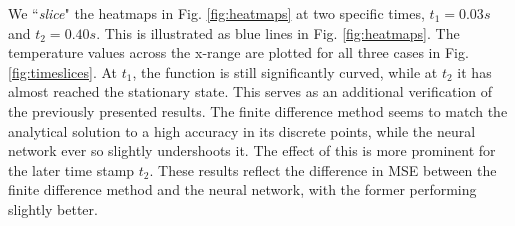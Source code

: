 We ``\textit{slice}" the heatmaps in Fig. \ref{fig:heatmaps} at two specific times, $t_1 = 0.03 s$ and $t_2 = 0.40 s$. 
This is illustrated as blue lines in Fig. \ref{fig:heatmaps}.
The temperature values across the x-range are plotted for all three cases in Fig. \ref{fig:timeslices}.
At $t_1$, the function is still significantly curved, while at $t_2$ it has almost reached the stationary state.
This serves as an additional verification of the previously presented results. 
The finite difference method seems to match the analytical solution to a high accuracy in its discrete points, while the neural network ever so slightly undershoots it.
The effect of this is more prominent for the later time stamp $t_2$. 
These results reflect the difference in MSE between the finite difference method and the neural network, with the former performing slightly better. 




